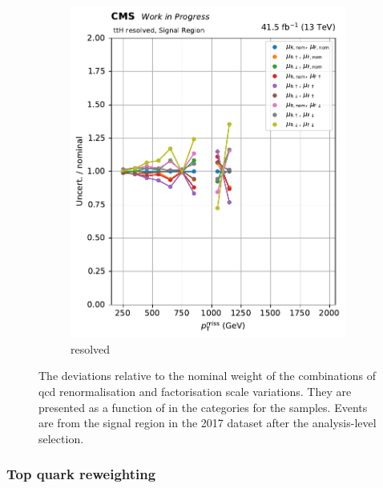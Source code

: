 \begin{figure}[htbp]
\begin{subfigure}[b]{0.34\textwidth}
        \includegraphics[width=\textwidth]{figures/ttbar_scale/ratio_vars_SR_ttH_resolved.pdf}
        \caption{\ttH resolved}
    \end{subfigure}
    \caption[The deviations relative to the nominal weight of the combinations of QCD renormalisation and factorisation scale variations. They are presented as a function of \ptmiss in the \ttH categories for the \ttbar samples]{The deviations relative to the nominal weight of the combinations of \acrshort{qcd} renormalisation and factorisation scale variations. They are presented as a function of \ptmiss in the \ttH categories for the \ttbar samples. Events are from the signal region in the 2017 dataset after the analysis-level selection.}
    \label{fig:htoinv_ttbar_scale}
\end{figure}





\subsubsection{Top quark \texorpdfstring{\pt}{pT} reweighting}
\label{subsubsec:htoinv_top_pt_reweighting}

